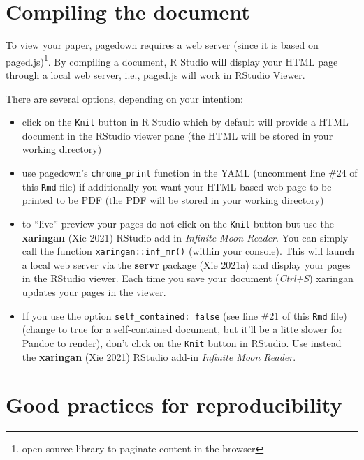 \documentclass[
  letterpaper,
  DIV=11,
  numbers=noendperiod]{scrartcl}
\begin{document}
\hypertarget{compiling-the-document}{%
\section{Compiling the document}\label{compiling-the-document}}

To view your paper, pagedown requires a web server (since it is based on
paged.js)\footnote{open-source library to paginate content in the
  browser}. By compiling a document, R Studio will display your HTML
page through a local web server, i.e., paged.js will work in RStudio
Viewer.

There are several options, depending on your intention:

\begin{itemize}
\item
  click on the \texttt{Knit} button in R Studio which by default will
  provide a HTML document in the RStudio viewer pane (the HTML will be
  stored in your working directory)
\item
  use pagedown's \texttt{chrome\_print} function in the YAML (uncomment
  line \#24 of this \texttt{Rmd} file) if additionally you want your
  HTML based web page to be printed to be PDF (the PDF will be stored in
  your working directory)
\item
  to ``live''-preview your pages do not click on the \texttt{Knit}
  button but use the \textbf{xaringan} (Xie 2021) RStudio add-in
  \emph{Infinite Moon Reader}. You can simply call the function
  \texttt{xaringan::inf\_mr()} (within your console). This will launch a
  local web server via the \textbf{servr} package (Xie 2021a) and
  display your pages in the RStudio viewer. Each time you save your
  document (\emph{Ctrl+S}) xaringan updates your pages in the viewer.
\item
  If you use the option \texttt{self\_contained:\ false} (see line \#21
  of this \texttt{Rmd} file) (change to true for a self-contained
  document, but it'll be a litte slower for Pandoc to render), don't
  click on the \texttt{Knit} button in RStudio. Use instead the
  \textbf{xaringan} (Xie 2021) RStudio add-in \emph{Infinite Moon
  Reader}.
\end{itemize}

\hypertarget{good-practices-for-reproducibility}{%
\section{Good practices for
reproducibility}\label{good-practices-for-reproducibility}}
\end{document}
